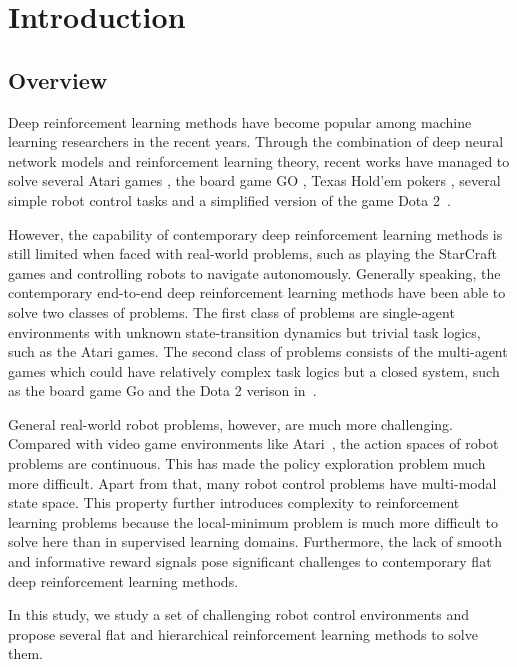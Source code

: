 
\chapter{Introduction}
\section{Overview}
Deep reinforcement learning methods have become popular among machine learning researchers in the recent years. Through the combination of deep neural network models and reinforcement learning theory, recent works have managed to solve several Atari games \cite{mnih2015human}, the board game GO \cite{silver2016mastering}, Texas Hold'em pokers \cite{heinrich2016deep}, several simple robot control tasks \cite{duan2016benchmarking} and a simplified version of the game Dota 2~\cite{openai_2018}.

However, the capability of contemporary deep reinforcement learning methods is still limited when faced with real-world problems, such as playing the StarCraft games and controlling robots to navigate autonomously. Generally speaking, the contemporary end-to-end deep reinforcement learning methods have been able to solve two classes of problems. The first class of problems are single-agent environments with unknown state-transition dynamics but trivial task logics, such as the Atari games. The second class of problems consists of the multi-agent games which could have relatively complex task logics but a closed system, such as the board game Go and the Dota 2 verison in~\cite{openai_2018}. 

General real-world robot problems, however, are much more challenging. Compared with video game environments like Atari~\cite{mnih2015human}, the action spaces of robot problems are continuous. This has made the policy exploration problem much more difficult. Apart from that, many robot control problems have multi-modal state space. This property further introduces complexity to reinforcement learning problems because the local-minimum problem is much more difficult to solve here than in supervised learning domains. Furthermore, the lack of smooth and informative reward signals pose significant challenges to contemporary flat deep reinforcement learning methods.

In this study, we study a set of challenging robot control environments and propose several flat and hierarchical reinforcement learning methods to solve them.
